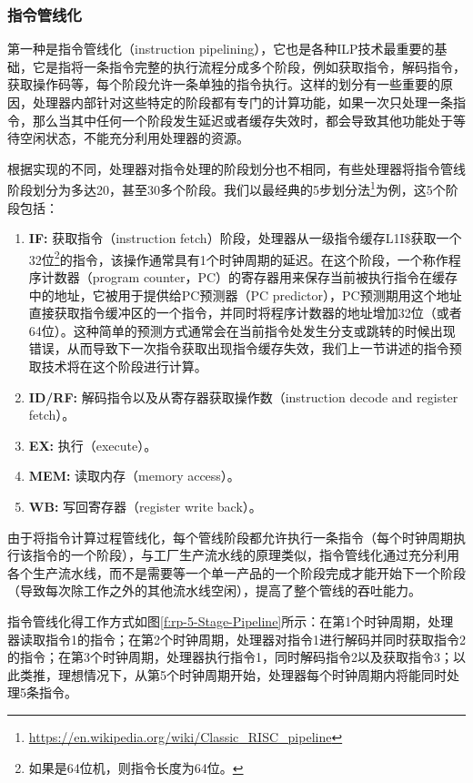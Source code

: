 \subsubsection{指令管线化}
第一种是指令管线化（instruction pipelining），它也是各种ILP技术最重要的基础，它是指将一条指令完整的执行流程分成多个阶段，例如获取指令，解码指令，获取操作码等，每个阶段允许一条单独的指令执行。这样的划分有一些重要的原因，处理器内部针对这些特定的阶段都有专门的计算功能，如果一次只处理一条指令，那么当其中任何一个阶段发生延迟或者缓存失效时，都会导致其他功能处于等待空闲状态，不能充分利用处理器的资源。

根据实现的不同，处理器对指令处理的阶段划分也不相同，有些处理器将指令管线阶段划分为多达20，甚至30多个阶段。我们以最经典的5步划分法\footnote{\url{https://en.wikipedia.org/wiki/Classic_RISC_pipeline}}为例，这5个阶段包括：

\begin{enumerate}
	\item \textbf{IF: } 获取指令（instruction fetch）阶段，处理器从一级指令缓存L1I\$获取一个32位\footnote{如果是64位机，则指令长度为64位。}的指令，该操作通常具有1个时钟周期的延迟。在这个阶段，一个称作程序计数器（program counter，PC）的寄存器用来保存当前被执行指令在缓存中的地址，它被用于提供给PC预测器（PC predictor），PC预测期用这个地址直接获取指令缓冲区的一个指令，并同时将程序计数器的地址增加32位（或者64位）。这种简单的预测方式通常会在当前指令处发生分支或跳转的时候出现错误，从而导致下一次指令获取出现指令缓存失效，我们上一节讲述的指令预取技术将在这个阶段进行计算。
	
	\item \textbf{ID/RF: } 解码指令以及从寄存器获取操作数（instruction decode and register fetch）。
	\item \textbf{EX: } 执行（execute）。
	\item \textbf{MEM: } 读取内存（memory access）。
	\item \textbf{WB: } 写回寄存器（register write back）。
\end{enumerate}


由于将指令计算过程管线化，每个管线阶段都允许执行一条指令（每个时钟周期执行该指令的一个阶段），与工厂生产流水线的原理类似，指令管线化通过充分利用各个生产流水线，而不是需要等一个单一产品的一个阶段完成才能开始下一个阶段（导致每次除工作之外的其他流水线空闲），提高了整个管线的吞吐能力。

指令管线化得工作方式如图\ref{f:rp-5-Stage-Pipeline}所示：在第1个时钟周期，处理器读取指令1的指令；在第2个时钟周期，处理器对指令1进行解码并同时获取指令2的指令；在第3个时钟周期，处理器执行指令1，同时解码指令2以及获取指令3；以此类推，理想情况下，从第5个时钟周期开始，处理器每个时钟周期内将能同时处理5条指令。

